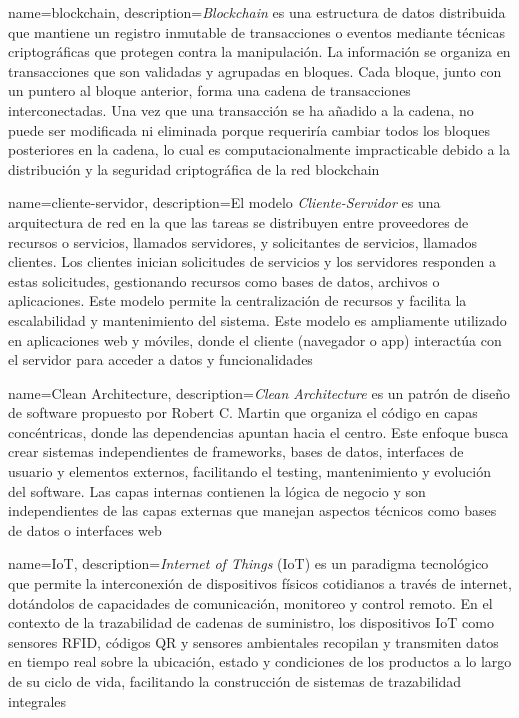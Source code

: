 
{
    name=blockchain,
    description={\textit{Blockchain} es una estructura de datos distribuida que mantiene un registro inmutable de transacciones o eventos mediante técnicas criptográficas que protegen contra la manipulación. La información se organiza en transacciones que son validadas y agrupadas en bloques. Cada bloque, junto con un puntero al bloque anterior, forma una cadena de transacciones interconectadas. Una vez que una transacción se ha añadido a la cadena, no puede ser modificada ni eliminada porque requeriría cambiar todos los bloques posteriores en la cadena, lo cual es computacionalmente impracticable debido a la distribución y la seguridad criptográfica de la red blockchain \cite{rennock2018blockchain}}
}

{
    name=cliente-servidor,
    description={El modelo \textit{Cliente-Servidor} es una arquitectura de red en la que las tareas se distribuyen entre proveedores de recursos o servicios, llamados servidores, y solicitantes de servicios, llamados clientes. Los clientes inician solicitudes de servicios y los servidores responden a estas solicitudes, gestionando recursos como bases de datos, archivos o aplicaciones. Este modelo permite la centralización de recursos y facilita la escalabilidad y mantenimiento del sistema. Este modelo es ampliamente utilizado en aplicaciones web y móviles, donde el cliente (navegador o app) interactúa con el servidor para acceder a datos y funcionalidades}
}

{
    name=Clean Architecture,
    description={\textit{Clean Architecture} es un patrón de diseño de software propuesto por Robert C. Martin que organiza el código en capas concéntricas, donde las dependencias apuntan hacia el centro. Este enfoque busca crear sistemas independientes de frameworks, bases de datos, interfaces de usuario y elementos externos, facilitando el testing, mantenimiento y evolución del software. Las capas internas contienen la lógica de negocio y son independientes de las capas externas que manejan aspectos técnicos como bases de datos o interfaces web}
}

{
    name=IoT,
    description={\textit{Internet of Things} (IoT) es un paradigma tecnológico que permite la interconexión de dispositivos físicos cotidianos a través de internet, dotándolos de capacidades de comunicación, monitoreo y control remoto. En el contexto de la trazabilidad de cadenas de suministro, los dispositivos IoT como sensores RFID, códigos QR y sensores ambientales recopilan y transmiten datos en tiempo real sobre la ubicación, estado y condiciones de los productos a lo largo de su ciclo de vida, facilitando la construcción de sistemas de trazabilidad integrales}
}

